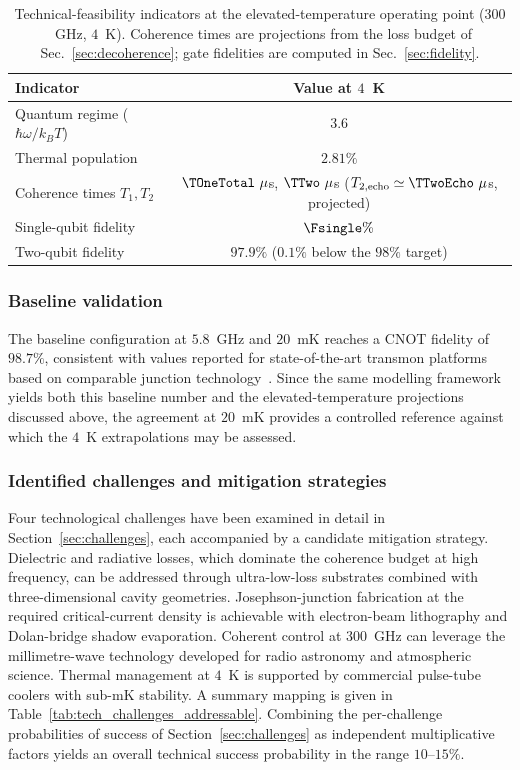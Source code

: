 \begin{table}[h]
\centering
\begin{tabular}{@{}lc@{}}
\toprule
\textbf{Indicator} & \textbf{Value at $4$~K} \\
\midrule
Quantum regime ($\hbar\omega/k_B T$)   & $3.6$ \\
Thermal population                     & $2.81\%$ \\
Coherence times $T_1, T_2$             & $\TOneTotal~\mu$s, $\TTwo~\mu$s ($T_{2,\text{echo}}\simeq \TTwoEcho~\mu$s, projected) \\
Single-qubit fidelity                  & $\Fsingle\%$ \\
Two-qubit fidelity                     & $97.9\%$ ($0.1\%$ below the $98\%$ target) \\
\bottomrule
\end{tabular}
\caption{Technical-feasibility indicators at the elevated-temperature operating point ($300$~GHz, $4$~K). Coherence times are projections from the loss budget of Sec.~\ref{sec:decoherence}; gate fidelities are computed in Sec.~\ref{sec:fidelity}.}
\label{tab:tech_feasibility_4K}
\end{table}

\subsubsection*{Baseline validation}

The baseline configuration at $5.8$~GHz and $20$~mK reaches a CNOT fidelity of $98.7\%$, consistent with values reported for state-of-the-art transmon platforms based on comparable junction technology~\cite{krantz2019, kim2021}. Since the same modelling framework yields both this baseline number and the elevated-temperature projections discussed above, the agreement at $20$~mK provides a controlled reference against which the $4$~K extrapolations may be assessed.

\subsubsection*{Identified challenges and mitigation strategies}

Four technological challenges have been examined in detail in Section~\ref{sec:challenges}, each accompanied by a candidate mitigation strategy. Dielectric and radiative losses, which dominate the coherence budget at high frequency, can be addressed through ultra-low-loss substrates combined with three-dimensional cavity geometries. Josephson-junction fabrication at the required critical-current density is achievable with electron-beam lithography and Dolan-bridge shadow evaporation. Coherent control at $300$~GHz can leverage the millimetre-wave technology developed for radio astronomy and atmospheric science. Thermal management at $4$~K is supported by commercial pulse-tube coolers with sub-mK stability. A summary mapping is given in Table~\ref{tab:tech_challenges_addressable}. Combining the per-challenge probabilities of success of Section~\ref{sec:challenges} as independent multiplicative factors yields an overall technical success probability in the range $10$--$15\%$.

